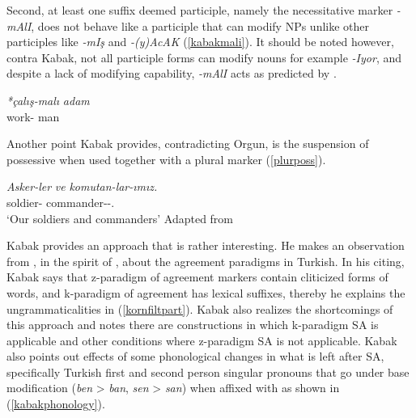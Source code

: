 Second, at least one suffix deemed participle, namely the necessitative marker \textit{-mAlI}, does not behave like a participle that can modify NPs unlike other participles like \textit{-mIş} and \textit{-(y)AcAK} (\ref{kabakmali}). It should be noted however, contra Kabak, not all participle forms can modify nouns for example \textit{-Iyor}, and despite a lack of modifying capability, \textit{-mAlI} acts as predicted by \cite{kornfilt1996some}.
\begin{exe}
    \ex \label{kabakmali}
    \gll 
    \textit{*çalış-malı} \textit{adam} \\ work-{\Nec} man \\
\end{exe}

Another point Kabak provides, contradicting Orgun, is the suspension of possessive when used together with a plural marker (\ref{plurposs}).

\begin{exe}
    \ex \label{plurposs}
    \gll
    \textit{Asker-ler} \textit{ve} \textit{komutan-lar-ımız.} \\ soldier-{\Pl} {\And} commander-{\Pl}-{\First}{\Pl}.{\Poss} \\
    \glt `Our soldiers and commanders'
    \hfill Adapted from \cite{kabak2007turkish}
\end{exe}

Kabak provides an approach that is rather interesting. He makes an observation from \cite{good2005morphosyntax}, in the spirit of \cite{erdal2000clitics}, about the agreement paradigms in Turkish. In his citing, Kabak says that z-paradigm of agreement markers contain cliticized forms of words, and k-paradigm of agreement has lexical suffixes, thereby he explains the ungrammaticalities in (\ref{kornfiltpart}). Kabak also realizes the shortcomings of this approach and notes there are constructions in which k-paradigm SA is applicable and other conditions where z-paradigm SA is not applicable. Kabak also points out effects of some phonological changes in what is left after SA, specifically Turkish first and second person singular pronouns that go under base modification (\textit{ben} {\textgreater} \textit{ban}, \textit{sen} {\textgreater} \textit{san}) when affixed with {\Dat} as shown in (\ref{kabakphonology}).

